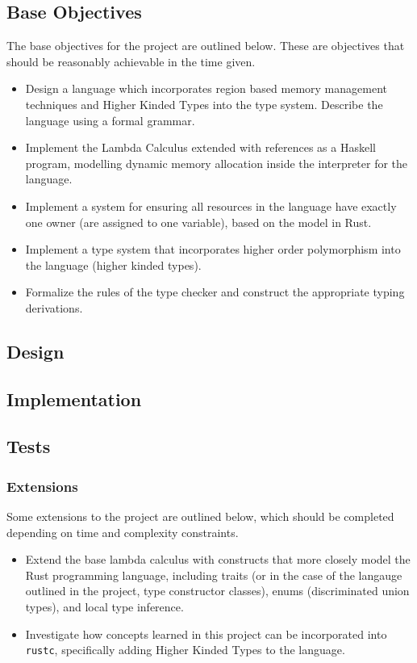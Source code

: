 \subsection{Base Objectives}
The base objectives for the project are outlined below. These are objectives
that should be reasonably achievable in the time given.

\begin{itemize}
    \item
        Design a language which incorporates region based memory management
        techniques and Higher Kinded Types into the type system. Describe the 
        language using a formal grammar.
    \item
        Implement the Lambda Calculus extended with references as a Haskell
        program, modelling dynamic memory allocation inside the interpreter for
        the language.
    \item
        Implement a system for ensuring all resources in the language have
        exactly one owner (are assigned to one variable), based on the model in
        Rust.
    \item
        Implement a type system that incorporates higher order polymorphism
        into the language (higher kinded types).
    \item
        Formalize the rules of the type checker and construct the appropriate
        typing derivations.
\end{itemize}

\subsection{Design}

\subsection{Implementation}

\subsection{Tests}

\subsubsection{Extensions}
Some extensions to the project are outlined below, which should be completed
depending on time and complexity constraints.

\begin{itemize}
    \item
        Extend the base lambda calculus with constructs that more closely model
        the Rust programming language, including traits (or in the case of the
        langauge outlined in the project, type constructor classes), enums 
        (discriminated union types), and local type inference.
    \item
        Investigate how concepts learned in this project can be incorporated
        into \texttt{rustc}, specifically adding Higher Kinded Types to the
        language.
\end{itemize}


